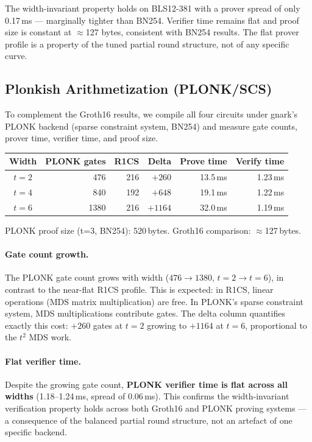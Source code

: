 \documentclass[preprint]{iacrtrans}
\begin{document}
The width-invariant property holds on BLS12-381 with a prover spread of 
only 0.17\,ms — marginally tighter than BN254. Verifier time remains 
flat and proof size is constant at $\approx$127 bytes, consistent with 
BN254 results. The flat prover profile is a property of the tuned partial 
round structure, not of any specific curve.

\subsection{Plonkish Arithmetization (PLONK/SCS)}

To complement the Groth16 results, we compile all four circuits under gnark's
PLONK backend (sparse constraint system, BN254) and measure gate counts,
prover time, verifier time, and proof size.

\begin{center}
\begin{tabular}{crrrrr}
\toprule
Width & PLONK gates & R1CS & Delta & Prove time & Verify time \\
\midrule
$t=2$ & 476 & 216 & $+260$ & 13.5\,ms & 1.23\,ms \\
$t=4$ & 840 & 192 & $+648$ & 19.1\,ms & 1.22\,ms \\
$t=6$ & 1380 & 216 & $+1164$ & 32.0\,ms & 1.19\,ms \\
\bottomrule
\end{tabular}
\end{center}

PLONK proof size (t=3, BN254): 520\,bytes. Groth16 comparison: $\approx$127\,bytes.

\paragraph{Gate count growth.} The PLONK gate count grows with width
($476 \to 1380$, $t=2 \to t=6$), in contrast to the near-flat R1CS profile.
This is expected: in R1CS, linear operations (MDS matrix multiplication) are
free. In PLONK's sparse constraint system, MDS multiplications contribute
gates. The delta column quantifies exactly this cost: $+260$ gates at $t=2$
growing to $+1164$ at $t=6$, proportional to the $t^2$ MDS work.

\paragraph{Flat verifier time.} Despite the growing gate count,
\textbf{PLONK verifier time is flat across all widths}
(1.18--1.24\,ms, spread of 0.06\,ms). This confirms the width-invariant
verification property holds across both Groth16 and PLONK proving systems
— a consequence of the balanced partial round structure, not an artefact
of one specific backend.
\end{document}

